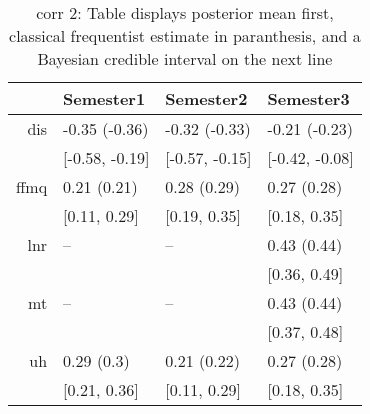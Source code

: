 \begin{table}[ht]
\centering
\begin{tabular}{rlll}
  \hline
 & Semester1 & Semester2 & Semester3 \\ 
  \hline
dis & -0.35 (-0.36) & -0.32 (-0.33) & -0.21 (-0.23) \\ 
   & [-0.58, -0.19] & [-0.57, -0.15] & [-0.42, -0.08] \\ 
  ffmq & 0.21 (0.21) & 0.28 (0.29) & 0.27 (0.28) \\ 
     & [0.11, 0.29] & [0.19, 0.35] & [0.18, 0.35] \\ 
  lnr & -- & -- & 0.43 (0.44) \\ 
       &  &  & [0.36, 0.49] \\ 
  mt & -- & -- & 0.43 (0.44) \\ 
         &  &  & [0.37, 0.48] \\ 
  uh & 0.29 (0.3) & 0.21 (0.22) & 0.27 (0.28) \\ 
           & [0.21, 0.36] & [0.11, 0.29] & [0.18, 0.35] \\ 
   \hline
\end{tabular}
\caption{corr 2: Table displays posterior mean first, classical frequentist estimate in paranthesis, and a Bayesian credible interval on the next line} 
\label{corr_2}
\end{table}
